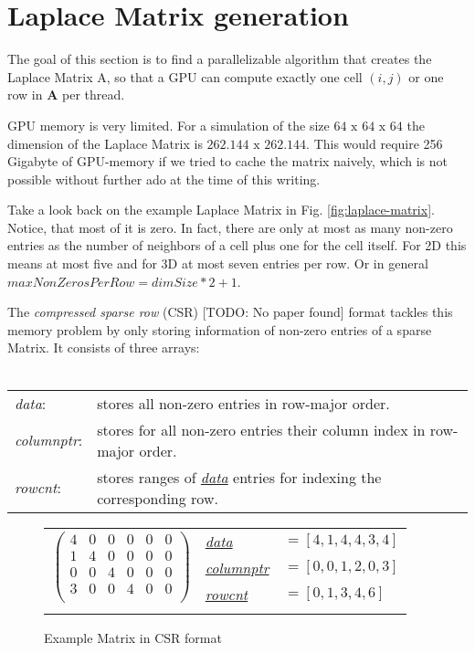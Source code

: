 \section{Laplace Matrix generation}
The goal of this section is to find a parallelizable algorithm that creates the Laplace Matrix A, so that a GPU can compute exactly one cell $(i,j)$ or one row in \textbf{A} per thread.
\par GPU memory is very limited. For a simulation of the size $64 \text{ x } 64 \text{ x } 64$ the dimension of the Laplace Matrix is $262.144 \text{ x } 262.144$. This would require 256 Gigabyte of GPU-memory if we tried to cache the matrix naively, which is not possible without further ado at the time of this writing. 
\par Take a look back on the example Laplace Matrix in Fig. \ref{fig:laplace-matrix}. Notice, that most of it is zero. In fact, there are only at most as many non-zero entries as the number of neighbors of a cell plus one for the cell itself. For 2D this means at most five and for 3D at most seven entries per row. Or in general $maxNonZerosPerRow = dimSize * 2 + 1$.
\par The \textit{compressed sparse row} (CSR) [TODO: No paper found] format tackles this memory problem by only storing information of non-zero entries of a sparse Matrix. It consists of three arrays:\\\\
\begin{tabular}{ll}
	\textit{data\label{csr-data}}: & stores all non-zero entries in row-major order.\\
	\textit{columnptr\label{csr-columnptr}}: & stores for all non-zero entries their column index in row-major order.\\
	\textit{rowcnt\label{csr-rowcnt}}: & stores ranges of \hyperref[csr-data]{\textit{data}} entries for indexing the corresponding row.\\
\end{tabular}
\begin{figure*}
	\centering
	\begin{tabular}{lll}
	\multirow{3}{*}{$\left( {\begin{array}{cccccc}
   4 & 0 & 0 & 0 & 0 & 0  \\
   1 & 4 & 0 & 0 & 0 & 0  \\
   0 & 0 & 4 & 0 & 0 & 0  \\
   3 & 0 & 0 & 4 & 0 & 0  \\
  \end{array} } \right)$}
	& \hyperref[csr-data]{\textit{data}} & $=[4,1,4,4,3,4]$  \\
	& \hyperref[csr-columnptr]{\textit{columnptr}} & $=[0,0,1,2,0,3]$ \\
	& \hyperref[csr-rowcnt]{\textit{rowcnt}} & $=[0,1,3,4,6]$ \\
	& & 
	\end{tabular}
\caption{Example Matrix in CSR format}\label{fig:csr-matrix}
\end{figure*}
